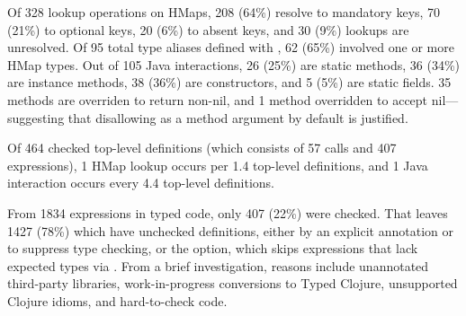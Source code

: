 

Of 328 lookup operations on HMaps,
208 (64\%) resolve to mandatory keys,
70 (21\%) to optional keys,
20 (6\%) to absent keys, and
30 (9\%) lookups are unresolved.
%
Of 95 total type aliases defined with ,
62 (65\%) involved one or more HMap types.
%
%
%
%
%
%
%
%
Out of 105 Java interactions, 26 (25\%) are static methods, 36 (34\%)
are instance methods, 38 (36\%) are constructors, and 5 (5\%) are static
fields. 35 methods are overriden to return non-nil, and 1 method 
overridden to accept nil---suggesting that
\coretyped{} disallowing  as a method argument by default
is justified.

Of 464 checked top-level definitions (which consists of
57  calls and 407  expressions),
1 HMap lookup occurs per 1.4 top-level definitions,
and 1 Java interaction occurs every 4.4 top-level definitions.

From 1834  expressions in typed code,
only 407 (22\%) were checked.
That leaves 1427 (78\%) which have unchecked definitions, either by an explicit  annotation
or  to suppress type checking,
or the  option, which skips  expressions
that lack expected types via .
From a brief investigation,
reasons include unannotated third-party libraries,
work-in-progress conversions to Typed Clojure,
unsupported Clojure idioms, 
and hard-to-check code.

